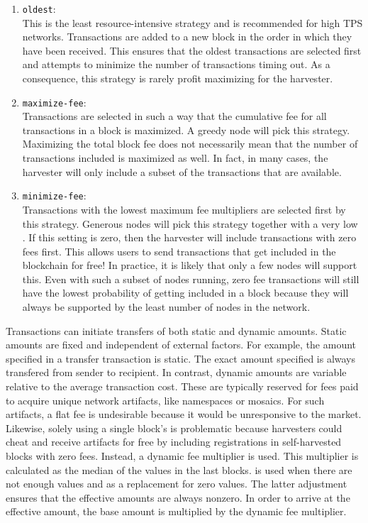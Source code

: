 \begin{enumerate}
\item{\texttt{oldest}: \\
This is the least resource-intensive strategy and is recommended for high TPS networks.
Transactions are added to a new block in the order in which they have been received.
This ensures that the oldest transactions are selected first and attempts to minimize the number of transactions timing out.
As a consequence, this strategy is rarely profit maximizing for the harvester.}
\item{\texttt{maximize-fee}: \\
Transactions are selected in such a way that the cumulative fee for all transactions in a block is maximized.
A greedy node will pick this strategy.
Maximizing the total block fee does not necessarily mean that the number of transactions included is maximized as well.
In fact, in many cases, the harvester will only include a subset of the transactions that are available.}
\item{\texttt{minimize-fee}: \\
Transactions with the lowest maximum fee multipliers are selected first by this strategy.
Generous nodes will pick this strategy together with a very low .
If this setting is zero, then the harvester will include transactions with zero fees first.
This allows users to send transactions that get included in the blockchain for free!
In practice, it is likely that only a few nodes will support this.
Even with such a subset of nodes running, zero fee transactions will still have the lowest probability of getting included in a block because they will always be supported by the least number of nodes in the network.}
\end{enumerate}

Transactions can initiate transfers of both static and dynamic amounts.
Static amounts are fixed and independent of external factors.
For example, the amount specified in a transfer transaction is static.
The exact amount specified is always transfered from sender to recipient.
In contrast, dynamic amounts are variable relative to the average transaction cost.
These are typically reserved for fees paid to acquire unique network artifacts, like namespaces or mosaics.
For such artifacts, a flat fee is undesirable because it would be unresponsive to the market.
Likewise, solely using a single block's  is problematic because harvesters could cheat and receive artifacts for free by including registrations in self-harvested blocks with zero fees.
Instead, a dynamic fee multiplier is used.
This multiplier is calculated as the median of the  values in the last  blocks.
 is used when there are not enough values and as a replacement for zero values.
The latter adjustment ensures that the effective amounts are always nonzero.
In order to arrive at the effective amount, the base amount is multiplied by the dynamic fee multiplier.

